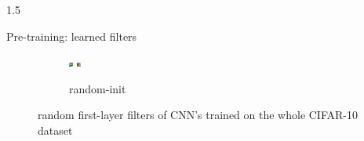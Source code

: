 \documentclass[final]{beamer}
\newlength{\onecolwid}
\newlength{\threecolwid}
\begin{document}
\begin{frame}[t]
\begin{columns}[t]
\begin{column}{\threecolwid}
\begin{columns}[t, totalwidth=\threecolwid]
\begin{column}{1.5\onecolwid}
\begin{block}{Pre-training: learned filters}
\begin{figure}
\begin{subfigure}{.4\linewidth}
				\includegraphics[width=0.1\linewidth]{graphics/cifar_filters/random_17.png} %
				\includegraphics[width=0.1\linewidth]{graphics/cifar_filters/random_18.png}
				\caption{random-init}
			\end{subfigure}

			\caption{random first-layer filters of CNN's trained on the whole CIFAR-10 dataset}

		\end{figure}

	\end{block}

\end{column}

\end{columns}




\end{column}
\end{columns} %

\end{frame} %
\end{document}
